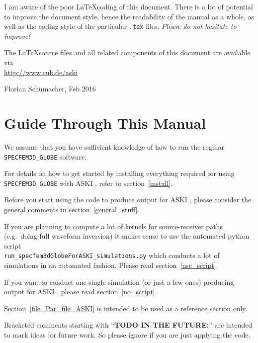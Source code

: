 \documentclass[12pt,a4paper]{article}
\newcommand{\lcode}[1]{\nolinkurl{#1}}
\newcommand{\ASKI}{ {\ttfamily ASKI} }
\begin{document}
I am aware of the poor \LaTeX coding of this document. There is a lot of potential
to improve the document 
style, hence the readability of the manual as a whole, as well as the coding style of the 
particular \lcode{.tex} files. \emph{Please do not hesitate to improve!}

The \LaTeX source files and all related components of this document are available via\\
\url{http://www.rub.de/aski}
\begin{flushright}
Florian Schumacher, Feb 2016
\end{flushright}

\newpage
%
\section*{Guide Through This Manual}
%
We assume that you have sufficient knowledge of how to run the regular \lcode{SPECFEM3D_GLOBE} software.

For details on how to get started by installing everything required for using \lcode{SPECFEM3D_GLOBE} 
with \ASKI, refer to section~\ref{install}{}. 

Before you start using the code to produce output for \ASKI, please consider the general
comments in section~\ref{general_stuff}.

If you are planning to compute a lot of kernels for source-receiver paths (e.g.\ doing full waveform inversion) 
it makes sense to use the automated python script \\ \lcode{run_specfem3dGlobeForASKI_simulations.py} 
which conducts a lot of simulations in an automated fashion. Please read section~\ref{use_script}. 

If you want to conduct one single simulation (or just a few ones) producing output for \ASKI , please 
read section~\ref{no_script}.

Section~\ref{file_Par_file_ASKI} is intended to be used as a reference section only.

Bracketed comments starting with ``{\bf TODO IN THE FUTURE:}'' are intended to mark ideas for future work. 
So please ignore if you are just applying the code.
%
\newpage
\tableofcontents
\newpage
%
\end{document}
